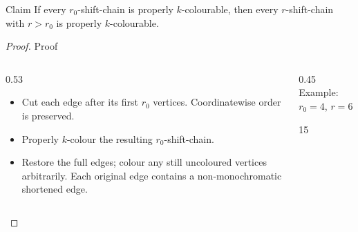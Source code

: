 \begin{frame}[t]
  \begin{lemma}{Claim}
    If every $r_0$-shift-chain is properly $k$-colourable, then every
    $r$-shift-chain with $r>r_0$ is properly $k$-colourable.
  \end{lemma}

  \begin{proof}{Proof}
    \small
    \begin{columns}[T,onlytextwidth]
      \begin{column}{0.53\textwidth}
        \begin{itemize}
          \item<2-> Cut each edge after its first $r_0$ vertices.
            Coordinatewise order is preserved.
          \item<3-> Properly $k$-colour the resulting $r_0$-shift-chain.
          \item<4-> Restore the full edges; colour any still uncoloured
            vertices arbitrarily.
            Each original edge contains a non-monochromatic shortened edge.
        \end{itemize}
      \end{column}
      \begin{column}{0.45\textwidth}
        \centering
        {\scriptsize Example: $r_0=4$, $r=6$}\par\smallskip
        \begin{shiftchain}[
          column sep=3.5mm, row sep=7mm,
          dot radius=2.7pt, dot color=black, label font=\tiny
        ]{15}
        \end{shiftchain}
      \end{column}
    \end{columns}
  \end{proof}

\end{frame}
